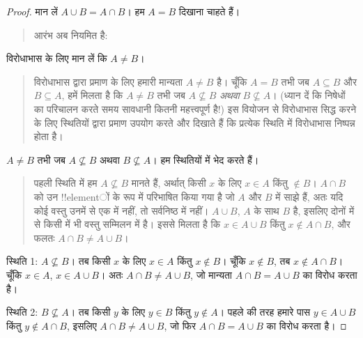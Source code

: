 \documentclass[../../../include/open-logic-section]{subfiles}
\begin{document}
\begin{proof}
  मान लें $A\cup B=A\cap B$। हम $A=B$ दिखाना चाहते हैं।
  \begin{quote}
    आरंभ अब नियमित है:
  \end{quote}
  विरोधाभास के लिए मान लें कि $A\neq B$।
  \begin{quote}
    विरोधाभास द्वारा प्रमाण के लिए हमारी मान्यता $A\neq B$ है। चूँकि
    $A=B$ तभी जब $A\subseteq B$ और $B\subseteq A$, हमें मिलता है कि
    $A\neq B$ तभी जब $A\nsubseteq B$ \emph{अथवा} $B\nsubseteq A$। (ध्यान
    दें कि निषेधों का परिचालन करते समय सावधानी कितनी महत्त्वपूर्ण है!{}) इस
    वियोजन से विरोधाभास सिद्ध करने के लिए स्थितियों द्वारा प्रमाण उपयोग करते
    और दिखाते हैं कि प्रत्येक स्थिति में विरोधाभास निष्पन्न होता है।
  \end{quote}
  $A\neq B$ तभी जब $A\nsubseteq B$ अथवा $B\nsubseteq A$। हम स्थितियों में
  भेद करते हैं।
  \begin{quote}
    पहली स्थिति में हम $A\nsubseteq B$ मानते हैं, अर्थात् किसी $x$ के लिए
    $x\in A$ किंतु $\notin B$। $A\cap B$ को उन !!{element}ों के रूप में
    परिभाषित किया गया है जो $A$ और $B$ में साझे हैं, अतः यदि कोई वस्तु उनमें
    से एक में नहीं, तो सर्वनिष्ठ में नहीं। $A\cup B$, $A$ के साथ $B$ है,
    इसलिए दोनों में से किसी में भी वस्तु सम्मिलन में है। इससे मिलता है कि
    $x\in A\cup B$ किंतु $x\notin A\cap B$, और फलतः
    $A\cap B\neq A\cup B$।
  \end{quote}
  
  स्थिति 1: $A\nsubseteq B$। तब किसी $x$ के लिए $x\in A$ किंतु
  $x\notin B$। चूँकि $x\notin B$, तब $x\notin A\cap B$। चूँकि $x\in A$,
  $x\in A\cup B$। अतः $A\cap B\neq A\cup B$, जो मान्यता
  $A\cap B=A\cup B$ का विरोध करता है।

  स्थिति 2: $B\nsubseteq A$। तब किसी $y$ के लिए $y\in B$ किंतु
  $y\notin A$। पहले की तरह हमारे पास $y\in A\cup B$ किंतु
  $y\notin A\cap B$, इसलिए $A\cap B\neq A\cup B$, जो फिर
  $A\cap B=A\cup B$ का विरोध करता है।
\end{proof}
\end{document}
